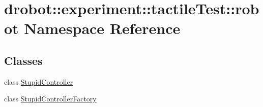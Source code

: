 \hypertarget{namespacedrobot_1_1experiment_1_1tactileTest_1_1robot}{\section{drobot\-:\-:experiment\-:\-:tactile\-Test\-:\-:robot Namespace Reference}
\label{namespacedrobot_1_1experiment_1_1tactileTest_1_1robot}
}
\subsection*{Classes}
\begin{DoxyCompactItemize}
\item 
class \hyperlink{classdrobot_1_1experiment_1_1tactileTest_1_1robot_1_1StupidController}{Stupid\-Controller}
\item 
class \hyperlink{classdrobot_1_1experiment_1_1tactileTest_1_1robot_1_1StupidControllerFactory}{Stupid\-Controller\-Factory}
\end{DoxyCompactItemize}
